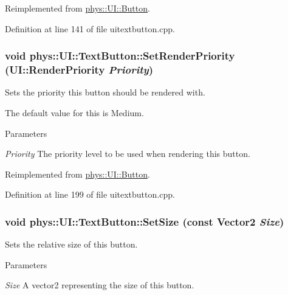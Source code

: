 Reimplemented from \hyperlink{classphys_1_1UI_1_1Button_a9bfcd08b027c80130dd2c7e6af119da5}{phys::UI::Button}.



Definition at line 141 of file uitextbutton.cpp.

\hypertarget{classphys_1_1UI_1_1TextButton_a7d4e22acd792b10f2f7986d8f449ec16}{
\subsubsection[{SetRenderPriority}]{\setlength{\rightskip}{0pt plus 5cm}void phys::UI::TextButton::SetRenderPriority (UI::RenderPriority {\em Priority})}}
\label{df/d03/classphys_1_1UI_1_1TextButton_a7d4e22acd792b10f2f7986d8f449ec16}


Sets the priority this button should be rendered with. 

The default value for this is Medium. 
\begin{DoxyParams}{Parameters}
\item[{\em Priority}]The priority level to be used when rendering this button. \end{DoxyParams}


Reimplemented from \hyperlink{classphys_1_1UI_1_1Button_a569053caa70448d560fd016d86ef52cb}{phys::UI::Button}.



Definition at line 199 of file uitextbutton.cpp.

\hypertarget{classphys_1_1UI_1_1TextButton_a7ed2a635d23906fcf1844e75018e20de}{
\subsubsection[{SetSize}]{\setlength{\rightskip}{0pt plus 5cm}void phys::UI::TextButton::SetSize (const {\bf Vector2} {\em Size})}}
\label{df/d03/classphys_1_1UI_1_1TextButton_a7ed2a635d23906fcf1844e75018e20de}


Sets the relative size of this button. 


\begin{DoxyParams}{Parameters}
\item[{\em Size}]A vector2 representing the size of this button. \end{DoxyParams}


